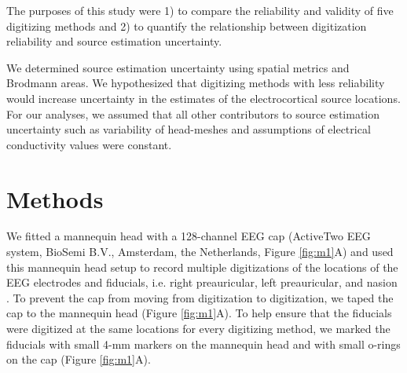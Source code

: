 \documentclass[../thesis_seyed.tex]{subfiles}
\begin{document}
The purposes of this study were 1) to compare the reliability and validity of five digitizing methods and 2) to quantify the relationship between digitization reliability and source estimation uncertainty. We determined source estimation uncertainty using spatial metrics and Brodmann areas.
We hypothesized that digitizing methods with less reliability would increase uncertainty in the estimates of the electrocortical source locations. For our analyses, we assumed that all other contributors to source estimation uncertainty such as variability of head-meshes and assumptions of electrical conductivity values were constant.

\section{Methods}

We fitted a mannequin head with a 128-channel EEG cap (ActiveTwo EEG system, BioSemi B.V., Amsterdam, the Netherlands, Figure \ref{fig:m1}A) and used this mannequin head setup to record multiple digitizations of the locations of the EEG electrodes and fiducials, i.e. right preauricular, left preauricular, and nasion \ul{\cite{Klem1999-ai}}. To prevent the cap from moving from digitization to digitization, we taped the cap to the mannequin head  (Figure \ref{fig:m1}A). To help ensure that the fiducials were digitized at the same locations for every digitizing method, we marked the fiducials with small 4-mm markers on the mannequin head and with small o-rings on the cap (Figure \ref{fig:m1}A). 
\end{document}
